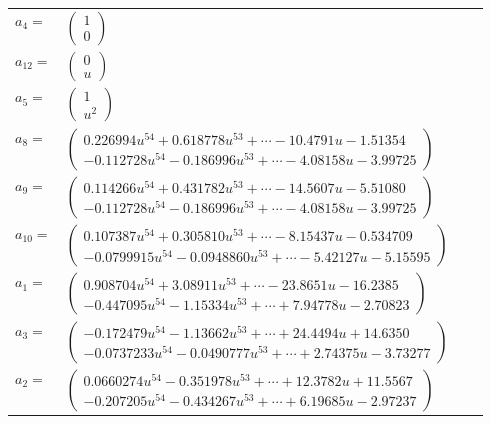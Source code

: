 \documentclass[1p]{elsarticle_modified}
\theoremstyle{definition}
\begin{document}
\begin{tabular}{m{7pt} m{180pt} m{7pt} m{180pt} }
\flushright $a_{4}=$&$\begin{pmatrix}1\\0\end{pmatrix}$ \\
\flushright $a_{12}=$&$\begin{pmatrix}0\\u\end{pmatrix}$ \\
\flushright $a_{5}=$&$\begin{pmatrix}1\\u^2\end{pmatrix}$ \\
\flushright $a_{8}=$&$\begin{pmatrix}0.226994 u^{54}+0.618778 u^{53}+\cdots-10.4791 u-1.51354\\-0.112728 u^{54}-0.186996 u^{53}+\cdots-4.08158 u-3.99725\end{pmatrix}$ \\
\flushright $a_{9}=$&$\begin{pmatrix}0.114266 u^{54}+0.431782 u^{53}+\cdots-14.5607 u-5.51080\\-0.112728 u^{54}-0.186996 u^{53}+\cdots-4.08158 u-3.99725\end{pmatrix}$ \\
\flushright $a_{10}=$&$\begin{pmatrix}0.107387 u^{54}+0.305810 u^{53}+\cdots-8.15437 u-0.534709\\-0.0799915 u^{54}-0.0948860 u^{53}+\cdots-5.42127 u-5.15595\end{pmatrix}$ \\
\flushright $a_{1}=$&$\begin{pmatrix}0.908704 u^{54}+3.08911 u^{53}+\cdots-23.8651 u-16.2385\\-0.447095 u^{54}-1.15334 u^{53}+\cdots+7.94778 u-2.70823\end{pmatrix}$ \\
\flushright $a_{3}=$&$\begin{pmatrix}-0.172479 u^{54}-1.13662 u^{53}+\cdots+24.4494 u+14.6350\\-0.0737233 u^{54}-0.0490777 u^{53}+\cdots+2.74375 u-3.73277\end{pmatrix}$ \\
\flushright $a_{2}=$&$\begin{pmatrix}0.0660274 u^{54}-0.351978 u^{53}+\cdots+12.3782 u+11.5567\\-0.207205 u^{54}-0.434267 u^{53}+\cdots+6.19685 u-2.97237\end{pmatrix}$ \\

\end{tabular}
\end{document}
